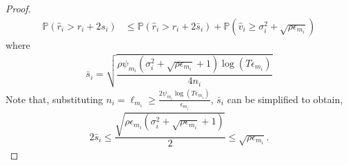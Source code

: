 \begin{proof}
\noindent
\begin{align}
\mathbb{P}(\hat{r}_{i}> r_{i} + 2s_{i})
&\leq \mathbb{P}\left( \hat{r}_{i} > r_{i}+ 2\bar{s}_i\right)  %
+ \mathbb{P}\left( \hat{v}_{i}\geq \sigma_{i}^{2}+\sqrt{\rho\epsilon_{m_{i}}}\right)\label{tbandit:eq:prob_eq2}
\end{align}
where 
\begin{align*}
\bar{s}_i=\sqrt{\dfrac{\rho\psi_{m_i} (\sigma_{i}^{2}+\sqrt{\rho\epsilon_{m_{i}}} + 1)\log( T\epsilon_{m_{i}})}{4n_{i}}}
\end{align*}
Note that, substituting $n_i=\ell_{m_i}\ge \frac{2\psi_{m_i}\log{(T\epsilon_{m_{i}})}}{\epsilon_{m_{i}}}$, $\bar{s}_i$ can be simplified to obtain,
\begin{align}
2\bar{s}_i
\leq \dfrac{\sqrt{\rho\epsilon_{m_{i}}(\sigma_{i}^{2}+\sqrt{\rho\epsilon_{m_{i}}} + 1)}}{2}\leq \sqrt{\rho \epsilon_{m_{i}}}.
\label{tbandit:si_bar_equn}
\end{align}



\end{proof}
